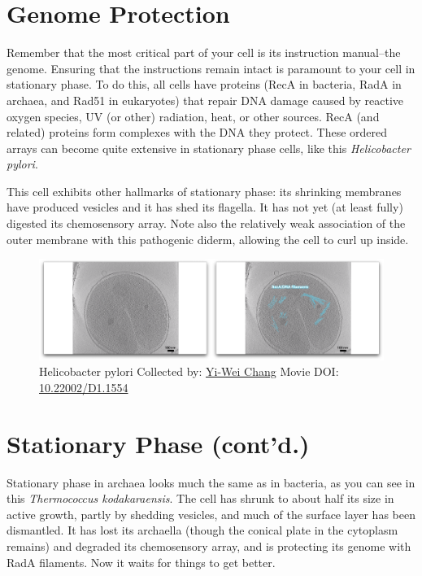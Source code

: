 \documentclass[]{tufte-book}
\begin{document}
\section{Genome Protection}\label{genome-protection}

Remember that the most critical part of your cell is its instruction
manual--the genome. Ensuring that the instructions remain intact is
paramount to your cell in stationary phase. To do this, all cells have
proteins (RecA in bacteria, RadA in archaea, and Rad51 in eukaryotes)
that repair DNA damage caused by reactive oxygen species, UV (or other)
radiation, heat, or other sources. RecA (and related) proteins form
complexes with the DNA they protect. These ordered arrays can become
quite extensive in stationary phase cells, like this \emph{Helicobacter
pylori}.

This cell exhibits other hallmarks of stationary phase: its shrinking
membranes have produced vesicles and it has shed its flagella. It has
not yet (at least fully) digested its chemosensory array. Note also the
relatively weak association of the outer membrane with this pathogenic
diderm, allowing the cell to curl up inside.





\begin{figure}
\includegraphics{movie_stills/8_2} \caption[Helicobacter pylori Collected by:
\protect\hyperlink{yi-wei_chang}{Yi-Wei Chang} Movie DOI:
\href{https://doi.org/10.22002/D1.1554}{10.22002/D1.1554}]{Helicobacter pylori Collected by:
\protect\hyperlink{yi-wei_chang}{Yi-Wei Chang} Movie DOI:
\href{https://doi.org/10.22002/D1.1554}{10.22002/D1.1554}}\label{fig:8-2}
\end{figure}

\section{Stationary Phase (cont'd.)}\label{stationary-phase-contd.}

Stationary phase in archaea looks much the same as in bacteria, as you
can see in this \emph{Thermococcus kodakaraensis}. The cell has shrunk
to about half its size in active growth, partly by shedding vesicles,
and much of the surface layer has been dismantled. It has lost its
archaella (though the conical plate in the cytoplasm remains) and
degraded its chemosensory array, and is protecting its genome with RadA
filaments. Now it waits for things to get better.
\end{document}
